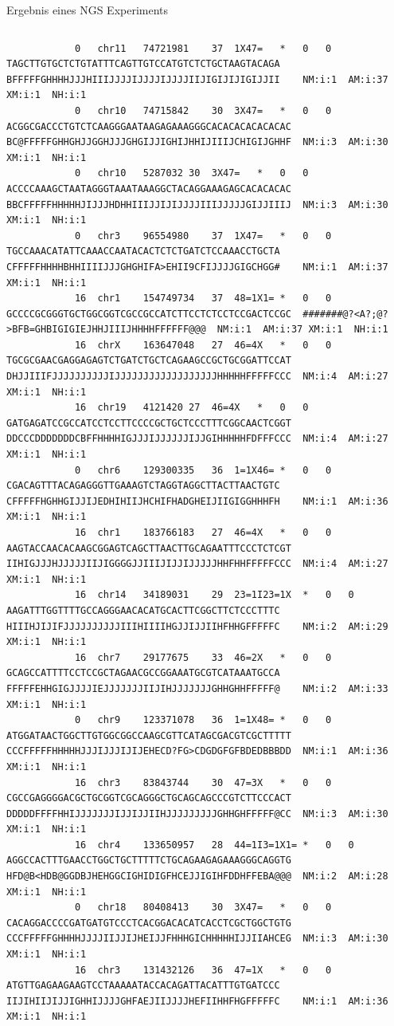 \documentclass[10pt]{beamer}
\begin{document}
\begin{frame}[fragile]{Ergebnis eines NGS Experiments}
\begin{columns}
\begin{lstlisting}
			0	chr11	74721981	37	1X47=	*	0	0	TAGCTTGTGCTCTGTATTTCAGTTGTCCATGTCTCTGCTAAGTACAGA	BFFFFFGHHHHJJJHIIIJJJJIJJJJIJJJJIIJIGIJIJIGIJJII	NM:i:1	AM:i:37	XM:i:1	NH:i:1
			0	chr10	74715842	30	3X47=	*	0	0	ACGGCGACCCTGTCTCAAGGGAATAAGAGAAAGGGCACACACACACACAC	BC@FFFFFGHHGHJJGGHJJJGHGIJJIGHIJHHIJIIIJCHIGIJGHHF	NM:i:3	AM:i:30	XM:i:1	NH:i:1
			0	chr10	5287032	30	3X47=	*	0	0	ACCCCAAAGCTAATAGGGTAAATAAAGGCTACAGGAAAGAGCACACACAC	BBCFFFFFHHHHHJIJJJHDHHIIIJJIJIJJJJIIIJJJJJGIJJIIIJ	NM:i:3	AM:i:30	XM:i:1	NH:i:1
			0	chr3	96554980	37	1X47=	*	0	0	TGCCAAACATATTCAAACCAATACACTCTCTGATCTCCAAACCTGCTA	CFFFFFHHHHBHHIIIIJJJGHGHIFA>EHII9CFIJJJJGIGCHGG#	NM:i:1	AM:i:37	XM:i:1	NH:i:1
			16	chr1	154749734	37	48=1X1=	*	0	0	GCCCCGCGGGTGCTGGCGGTCGCCGCCATCTTCCTCTCCTCCGACTCCGC	#######@?<A?;@?>BFB=GHBIGIGIEJHHJIIIJHHHHFFFFFF@@@	NM:i:1	AM:i:37	XM:i:1	NH:i:1
			16	chrX	163647048	27	46=4X	*	0	0	TGCGCGAACGAGGAGAGTCTGATCTGCTCAGAAGCCGCTGCGGATTCCAT	DHJJIIIFJJJJJJJJJJIJJJJJJJJJJJJJJJJJJHHHHHFFFFFCCC	NM:i:4	AM:i:27	XM:i:1	NH:i:1
			16	chr19	4121420	27	46=4X	*	0	0	GATGAGATCCGCCATCCTCCTTCCCCGCTGCTCCCTTTCGGCAACTCGGT	DDCCCDDDDDDDCBFFHHHHIGJJJIJJJJJJIJJGIHHHHHFDFFFCCC	NM:i:4	AM:i:27	XM:i:1	NH:i:1
			0	chr6	129300335	36	1=1X46=	*	0	0	CGACAGTTTACAGAGGGTTGAAAGTCTAGGTAGGCTTACTTAACTGTC	CFFFFFHGHHGIJJIJEDHIHIIJHCHIFHADGHEIJIIGIGGHHHFH	NM:i:1	AM:i:36	XM:i:1	NH:i:1
			16	chr1	183766183	27	46=4X	*	0	0	AAGTACCAACACAAGCGGAGTCAGCTTAACTTGCAGAATTTCCCTCTCGT	IIHIGJJJHJJJJJIIJIGGGGJJIIIJIJJIJJJJJHHFHHFFFFFCCC	NM:i:4	AM:i:27	XM:i:1	NH:i:1
			16	chr14	34189031	29	23=1I23=1X	*	0	0	AAGATTTGGTTTTGCCAGGGAACACATGCACTTCGGCTTCTCCCTTTC	HIIIHJIJIFJJJJJJJJJJIIIHIIIIHGJJIJJIIHFHHGFFFFFC	NM:i:2	AM:i:29	XM:i:1	NH:i:1
			16	chr7	29177675	33	46=2X	*	0	0	GCAGCCATTTTCCTCCGCTAGAACGCCGGAAATGCGTCATAAATGCCA	FFFFFEHHGIGJJJJIEJJJJJJJIIJIHJJJJJJJGHHGHHFFFFF@	NM:i:2	AM:i:33	XM:i:1	NH:i:1
			0	chr9	123371078	36	1=1X48=	*	0	0	ATGGATAACTGGCTTGTGGCGGCCAAGCGTTCATAGCGACGTCGCTTTTT	CCCFFFFFHHHHHJJJIJJJIJIJEHECD?FG>CDGDGFGFBDEDBBBDD	NM:i:1	AM:i:36	XM:i:1	NH:i:1
			16	chr3	83843744	30	47=3X	*	0	0	CGCCGAGGGGACGCTGCGGTCGCAGGGCTGCAGCAGCCCGTCTTCCCACT	DDDDDFFFFHHIJJJJJJJIJJIJJIIHJJJJJJJJJGHHGHFFFFF@CC	NM:i:3	AM:i:30	XM:i:1	NH:i:1
			16	chr4	133650957	28	44=1I3=1X1=	*	0	0	AGGCCACTTTGAACCTGGCTGCTTTTTCTGCAGAAGAGAAAGGGCAGGTG	HFD@B<HDB@GGDBJHEHGGCIGHIDIGFHCEJJIGIHFDDHFFEBA@@@	NM:i:2	AM:i:28	XM:i:1	NH:i:1
			0	chr18	80408413	30	3X47=	*	0	0	CACAGGACCCCGATGATGTCCCTCACGGACACATCACCTCGCTGGCTGTG	CCCFFFFFGHHHHJJJJIIJJIJHEIJJFHHHGICHHHHHIJJIIAHCEG	NM:i:3	AM:i:30	XM:i:1	NH:i:1
			16	chr3	131432126	36	47=1X	*	0	0	ATGTTGAGAAGAAGTCCTAAAAATACCACAGATTACATTTGTGATCCC	IIJIHIIJIJJIGHHIJJJJGHFAEJIIJJJJHEFIIHHFHGFFFFFC	NM:i:1	AM:i:36	XM:i:1	NH:i:1

\end{lstlisting}
\end{columns}
\end{frame}
\end{document}
